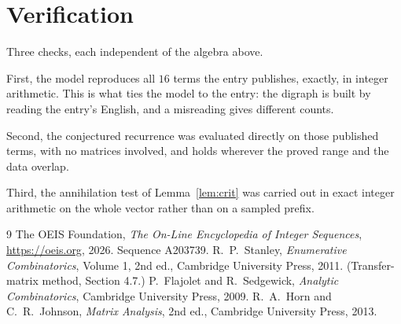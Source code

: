 \documentclass[11pt,a4paper]{article}
\theoremstyle{plain}
\theoremstyle{definition}
\begin{document}
\section{Verification}

Three checks, each independent of the algebra above.

First, the model reproduces all $16$ terms the entry publishes, exactly, in integer
arithmetic. This is what ties the model to the entry: the digraph is built by reading the
entry's English, and a misreading gives different counts.

Second, the conjectured recurrence was evaluated directly on those published terms, with no
matrices involved, and holds wherever the proved range and the data overlap.

Third, the annihilation test of Lemma~\ref{lem:crit} was carried out in exact integer
arithmetic on the whole vector rather than on a sampled prefix.

\begin{thebibliography}{9}
 The OEIS Foundation, \emph{The On-Line Encyclopedia of Integer
Sequences}, \url{https://oeis.org}, 2026. Sequence A203739.
 R.~P.~Stanley, \emph{Enumerative Combinatorics}, Volume 1, 2nd ed.,
Cambridge University Press, 2011. (Transfer-matrix method, Section 4.7.)
 P.~Flajolet and R.~Sedgewick, \emph{Analytic Combinatorics}, Cambridge
University Press, 2009.
 R.~A.~Horn and C.~R.~Johnson, \emph{Matrix Analysis}, 2nd ed., Cambridge
University Press, 2013.
\end{thebibliography}
\end{document}
